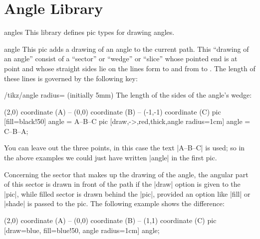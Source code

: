%
%
%


\section{Angle Library}
\label{section-angle}

\begin{tikzlibrary}{angles}
    This library defines pic types for drawing angles.
\end{tikzlibrary}

\begin{pictype}{angle}{}
    This pic adds a drawing of an angle to the current path. This ``drawing of
    an angle'' consist of a ``sector'' or ``wedge'' or ``slice'' whose pointed
    end is at point  and whose straight sides lie on the lines form
     to  and from  to . The length of these
    lines is governed by the following key:
    \begin{key}{/tikz/angle radius= (initially 5mm)}
        The length of the sides of the angle's wedge:
\begin{codeexample}[preamble={\usetikzlibrary{angles}}]
\tikz \draw (2,0) coordinate (A) -- (0,0) coordinate (B)
         -- (-1,-1) coordinate (C)
           pic [fill=black!50]                      {angle = A--B--C}
           pic [draw,->,red,thick,angle radius=1cm] {angle = C--B--A};
\end{codeexample}
    \end{key}

    You can leave out the three points, in this case the text |A--B--C| is
    used; so in the above examples we could just have written |{angle}| in the
    first pic.

    Concerning the sector that makes up the drawing of the angle, the angular
    part of this sector is drawn in front of the path if the |draw| option is
    given to the |pic|, while filled sector is drawn behind the |pic|, provided
    an option like |fill| or |shade| is passed to the pic. The following
    example shows the difference:
\begin{codeexample}[preamble={\usetikzlibrary{angles}}]
\tikz \draw [line width=2mm]
      (2,0) coordinate (A) -- (0,0) coordinate (B)
   -- (1,1) coordinate (C)
     pic [draw=blue, fill=blue!50, angle radius=1cm] {angle};
\end{codeexample}


\end{pictype}

